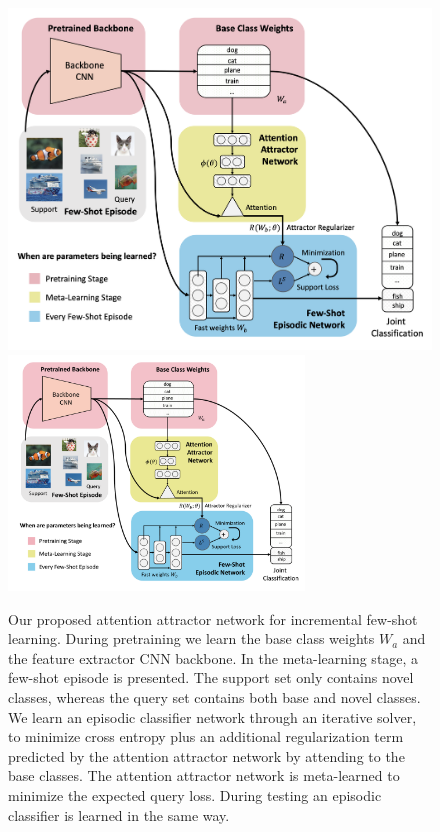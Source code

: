 \begin{figure}[t]
\centering
\iflatexml
\includegraphics[width=6\textwidth]{figures/mainfig.png}
\else
\includegraphics[width=0.7\textwidth,trim={1cm 0 0 0.7cm},clip]{figures/attractor_v4.pdf}
\fi
\caption{Our proposed attention attractor network for incremental few-shot learning.
During pretraining we learn the base class weights $W_a$ and the feature extractor CNN backbone. In
the meta-learning stage, a few-shot episode is presented. The support set only contains novel
classes, whereas the query set contains both base and novel classes. We learn an episodic classifier
network through an iterative solver, to minimize cross entropy plus an additional regularization
term predicted by the attention attractor network by attending to the base classes. The attention
attractor network is meta-learned to minimize the expected query loss. During testing an episodic
classifier is learned in the same way.}
\label{fig:model}
\end{figure}